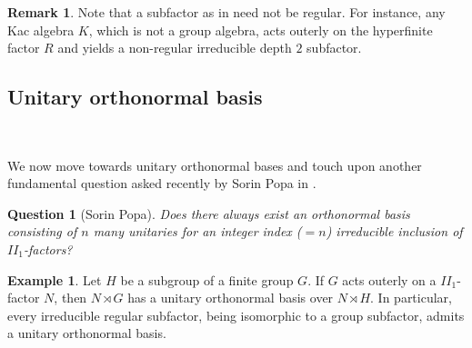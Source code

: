 \documentclass{amsart}
\newtheorem{question}[theorem]{Question}
\theoremstyle{definition}
\newtheorem{example}[theorem]{Example}
\theoremstyle{theorem}
\newtheorem{remark}[theorem]{Remark}
\begin{document}
\begin{remark}
Note that a subfactor as in  need not be regular. For instance,
any  Kac algebra $K$,  which is not a group algebra, acts outerly on
the hyperfinite factor $R$ and yields a non-regular irreducible depth
$2$ subfactor.
  \end{remark}
\subsection{Unitary orthonormal basis} \( \)

We now move towards unitary orthonormal bases and touch upon another
fundamental question asked recently by Sorin Popa in \cite[$\S$
  3.5]{pop1}.
\begin{question}[Sorin Popa]\label{popa}
 Does there always exist an orthonormal basis consisting of $n$ many
 unitaries for an integer index ($=n$) irreducible inclusion of
 $II_1$-factors?
\end{question}


\begin{example}\label{subgroup-subfactor}
Let $H$ be a subgroup of a finite group $G$. If $G$ acts
  outerly on a $II_1$-factor $N$, then $N \rtimes G$ has a unitary
  orthonormal basis over $N\rtimes H$.
  In particular, every irreducible regular subfactor, being isomorphic to a group
  subfactor, admits a unitary orthonormal basis.
\end{example}
\color{black}
\end{document}
